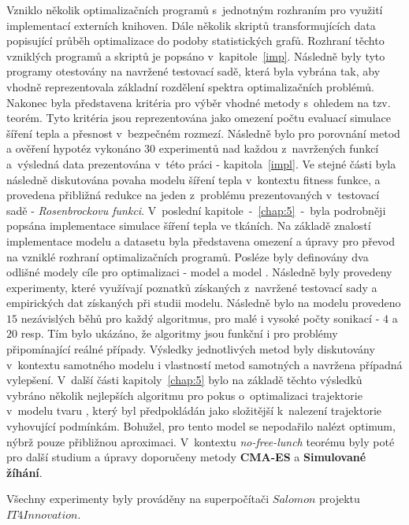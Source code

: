 Vzniklo několik optimalizačních programů s~jednotným rozhraním pro využití implementací externích knihoven. Dále několik skriptů transformujících data popisující průběh optimalizace do podoby statistických grafů. Rozhraní těchto vzniklých programů a skriptů je popsáno v~kapitole~\ref{imp}. Následně byly tyto programy otestovány na navržené testovací sadě, která byla vybrána tak, aby vhodně reprezentovala základní rozdělení spektra optimalizačních problémů. Nakonec byla představena kritéria pro výběr vhodné metody s~ohledem na tzv.  teorém. Tyto kritéria jsou reprezentována jako omezení počtu evaluací simulace šíření tepla a přesnost v~bezpečném rozmezí. Následně bylo pro porovnání metod a ověření hypotéz vykonáno $30$ experimentů nad každou z~navržených funkcí a~výsledná data prezentována v~této práci - kapitola~\ref{impl}. Ve stejné části byla následně diskutována povaha modelu šíření tepla v~kontextu  fitness funkce, a provedena přibližná redukce na jeden z~problému prezentovaných v~testovací sadě - \textit{Rosenbrockovu funkci}. V~poslední kapitole~-~\ref{chap:5}~-~byla podrobněji popsána implementace simulace šíření tepla ve tkáních. Na základě znalostí implementace modelu a datasetu byla představena omezení a úpravy pro převod na vzniklé rozhraní optimalizačních programů. Posléze byly definovány dva odlišné modely cíle pro optimalizaci - model  a model . Následně byly provedeny experimenty, které využívají poznatků získaných z~navržené testovací sady a empirických dat získaných při studii modelu. Následně bylo na modelu  provedeno $15$ nezávislých běhů pro každý algoritmus, pro malé i vysoké počty sonikací - $4$ a $20$ resp. Tím bylo ukázáno, že algoritmy jsou funkční i pro problémy připomínající reálné případy. Výsledky jednotlivých metod byly diskutovány v~kontextu samotného modelu i vlastností metod samotných a navržena případná vylepšení.
V~další části kapitoly~\ref{chap:5} bylo na základě těchto výsledků vybráno několik nejlepších algoritmu pro pokus o~optimalizaci trajektorie v~modelu tvaru , který byl předpokládán jako složitější k~nalezení trajektorie vyhovující podmínkám. Bohužel, pro tento model se nepodařilo nalézt optimum, nýbrž pouze přibližnou aproximaci. V~kontextu \emph{no-free-lunch} teorému byly poté pro další studium a úpravy doporučeny metody \textbf{CMA-ES} a \textbf{Simulované žíhání}.

Všechny experimenty  byly prováděny na superpočítači $Salomon$ projektu $IT4Innovation$.





